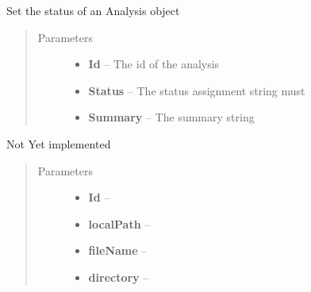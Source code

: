 \documentclass[letterpaper,10pt,english]{sphinxmanual}
\begin{document}
\begin{fulllineitems}
\begin{fulllineitems}
\end{fulllineitems}


\begin{fulllineitems}
\label{Available modules:BaseSpacePy.api.BaseSpaceAPI.BaseSpaceAPI.markAnalysisState}
Set the status of an Analysis object
\begin{quote}\begin{description}
\item[{Parameters}] \leavevmode\begin{itemize}
\item {} 
\textbf{Id} -- The id of the analysis

\item {} 
\textbf{Status} -- The status assignment string must

\item {} 
\textbf{Summary} -- The summary string

\end{itemize}

\end{description}\end{quote}

\end{fulllineitems}


\begin{fulllineitems}
\label{Available modules:BaseSpacePy.api.BaseSpaceAPI.BaseSpaceAPI.multipartFileUpload}
Not Yet implemented
\begin{quote}\begin{description}
\item[{Parameters}] \leavevmode\begin{itemize}
\item {} 
\textbf{Id} -- 

\item {} 
\textbf{localPath} -- 

\item {} 
\textbf{fileName} -- 

\item {} 
\textbf{directory} -- 


\end{itemize}
\end{description}
\end{quote}
\end{fulllineitems}
\end{fulllineitems}
\end{document}

